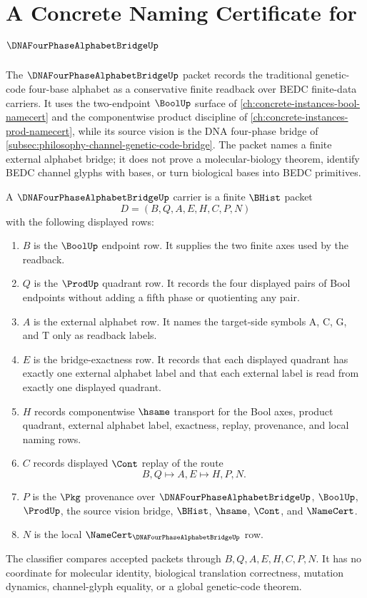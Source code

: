 \chapter{A Concrete Naming Certificate for $\DNAFourPhaseAlphabetBridgeUp$}
\label{ch:concrete-instances-dna-four-phase-alphabet-bridge-namecert}

The $\DNAFourPhaseAlphabetBridgeUp$ packet records the traditional genetic-code four-base alphabet as a conservative finite readback over BEDC finite-data carriers. It uses the two-endpoint $\BoolUp$ surface of \autoref{ch:concrete-instances-bool-namecert} and the componentwise product discipline of \autoref{ch:concrete-instances-prod-namecert}, while its source vision is the DNA four-phase bridge of \autoref{subsec:philosophy-channel-genetic-code-bridge}. The packet names a finite external alphabet bridge; it does not prove a molecular-biology theorem, identify BEDC channel glyphs with bases, or turn biological bases into BEDC primitives.

\begin{definition}
\label{def:dna-four-phase-alphabet-bridge-carrier}
A $\DNAFourPhaseAlphabetBridgeUp$ carrier is a finite $\BHist$ packet
$$
D=(B,Q,A,E,H,C,P,N)
$$
with the following displayed rows:
\begin{enumerate}
\item $B$ is the $\BoolUp$ endpoint row. It supplies the two finite axes used by the readback.
\item $Q$ is the $\ProdUp$ quadrant row. It records the four displayed pairs of Bool endpoints without adding a fifth phase or quotienting any pair.
\item $A$ is the external alphabet row. It names the target-side symbols $\mathrm{A}$, $\mathrm{C}$, $\mathrm{G}$, and $\mathrm{T}$ only as readback labels.
\item $E$ is the bridge-exactness row. It records that each displayed quadrant has exactly one external alphabet label and that each external label is read from exactly one displayed quadrant.
\item $H$ records componentwise $\hsame$ transport for the Bool axes, product quadrant, external alphabet label, exactness, replay, provenance, and local naming rows.
\item $C$ records displayed $\Cont$ replay of the route
$$
B,Q \longmapsto A,E \longmapsto H,P,N .
$$
\item $P$ is the $\Pkg$ provenance over $\DNAFourPhaseAlphabetBridgeUp$, $\BoolUp$, $\ProdUp$, the source vision bridge, $\BHist$, $\hsame$, $\Cont$, and $\NameCert$.
\item $N$ is the local $\NameCert_{\DNAFourPhaseAlphabetBridgeUp}$ row.
\end{enumerate}
The classifier compares accepted packets through $B,Q,A,E,H,C,P,N$. It has no coordinate for molecular identity, biological translation correctness, mutation dynamics, channel-glyph equality, or a global genetic-code theorem.
\end{definition}

